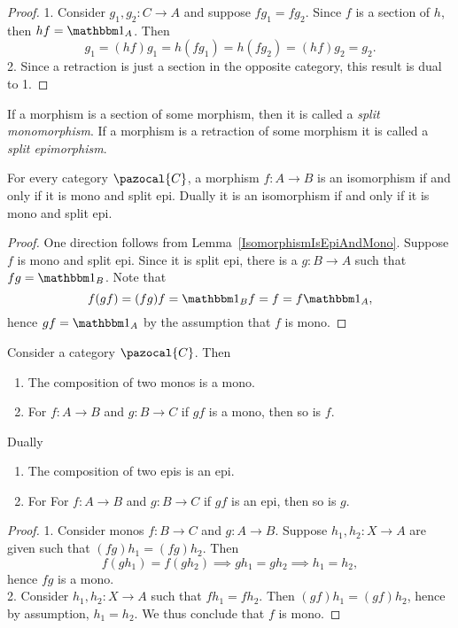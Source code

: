 \begin{proof}
    1. Consider $g_1,g_2: C\rightarrow A$ and suppose $fg_1 = f g_2$. Since $f$ is a section of $h$, then $hf = \fone_A$. Then 
    $$
        g_1 = (hf)g_1 = h(fg_1) = h (fg_2)= (hf)g_2 = g_2.
    $$
    2. Since a retraction is just a section in the opposite category, this result is dual to 1.
\end{proof}
\begin{remark}
    If a morphism is a section of some morphism, then it is called a \emph{split monomorphism}. If a morphism is a retraction of some morphism it is called a \emph{split epimorphism}.
\end{remark}
\begin{lemma}
    For every category $\pazocal{C}$, a morphism $f : A\rightarrow B$ is an isomorphism if and only if it is mono and split epi. Dually it is an isomorphism if and only if it is mono and split epi.
\end{lemma}
\begin{proof}
    One direction follows from Lemma~\ref{IsomorphismIsEpiAndMono}. Suppose $f$ is mono and split epi. Since it is split epi, there is a $g:B\rightarrow A$ such that $fg = \fone_B$. Note that 
    $$f(gf)=(fg)f=\fone_B f= f = f\fone_A,$$
    hence $gf = \fone_A$ by the assumption that $f$ is mono.
\end{proof}
\begin{lemma}
    Consider a category $\pazocal{C}$. Then 
    \begin{enumerate}
        \item The composition of two monos is a mono.
        \item For $f:A\rightarrow B$ and $g : B\rightarrow C$ if $gf$ is a mono, then so is $f$. 
    \end{enumerate}
    Dually 
    \begin{enumerate}
        \item The composition of two epis is an epi.
        \item For For $f:A\rightarrow B$ and $g : B\rightarrow C$ if $gf$ is an epi, then so is $g$.
    \end{enumerate}
\end{lemma}
\begin{proof}
    1. Consider monos $f: B\rightarrow C$ and $g:A\rightarrow B$. Suppose $h_1,h_2 : X\rightarrow A$ are given such that $(fg)h_1 = (fg)h_2$. Then 
    $$f(gh_1)=f(gh_2)\implies gh_1 = gh_2 \implies h_1 =h_2,$$
    hence $fg$ is a mono.\\
    2. Consider $h_1,h_2 : X \rightarrow A$ such that $fh_1 = fh_2$. Then $(gf)h_1 = (gf)h_2$, hence by assumption, $h_1 = h_2$. We thus conclude that $f$ is mono.
\end{proof}
